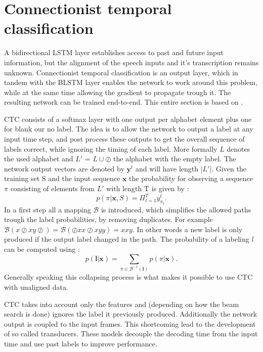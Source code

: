 \section{Connectionist temporal classification}
A bidirectional LSTM layer establishes access to past and future input information, but the alignment of the speech inputs and it's transcription remains unknown. Connectionist temporal classification is an output layer, which in tandem with the BLSTM layer enables the network to work around this problem, while at the same time allowing the gradient to propagate trough it. The resulting network can be trained end-to-end. This entire section is based on \cite[chapter 7]{Graves2008}.

CTC consists of a softmax layer with one output per alphabet element plus one for blank our no label. The idea is to allow the network to output a label at any input time step, and post process these outputs to get the overall sequence of labels correct, while ignoring the timing of each label. 
More formally $L$ denotes the used alphabet and $L'$ = $L \cup \oslash $ the alphabet with the empty label. The network output vectors are denoted by $\mathbf{y}^t$ and will have length $|L'|$. Given the training set S and the input sequence $\mathbf{x}$ the probability for observing a sequence $\pi$ consisting of elements from $L'$ with length T is given by \cite[page 56]{Graves2008}:
\begin{equation}
p(\pi| \mathbf{x}, S) = \Pi_{t=1}^T y^t_{\pi_t}.
\end{equation}
In a first step all a mapping $\mathcal{B}$ is introduced, which simplifies the allowed paths trough the label probabilities, by removing duplicates. For example $\mathcal{B}(x \oslash xy \oslash) = \mathcal{B}(\oslash x x \oslash xyy) = xxy$. In other words a new label is only produced if the output label changed in the path. The probability of a labeling $l$ can be computed using \cite[page 57]{Graves2008}:
\begin{equation}
p(\mathbf{l|\mathbf{x}}) = \sum\limits_{\pi \in \mathcal{B}^{-1}(\mathbf{l})}p(\pi|\mathbf{x}).
\end{equation} 
Generally speaking this collapsing process is what makes it possible to use CTC with unaligned data. 

CTC takes into account only the features and (depending on how the beam search is done) ignores the label it previously produced. Additionally the network output is coupled to the input frames. This shortcoming lead to the development of so called transducers. These models decouple the decoding time from the input time and use past labels to improve performance.



